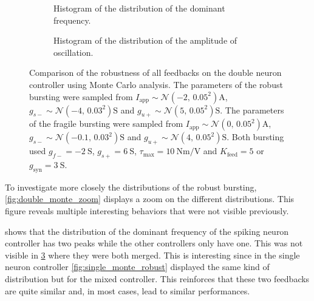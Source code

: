 \begin{figure}[!htbp]
    \centering
    \begin{subfigure}[b]{\textwidth}
        \centering
        \caption{Histogram of the distribution of the dominant frequency.}
        \label{fig:double_monte_freq}
    \end{subfigure}
    
    \begin{subfigure}[b]{\textwidth}
        \centering
        \caption{Histogram of the distribution of the amplitude of oscillation.}
        \label{fig:double_monte_range}
    \end{subfigure}
    \caption{Comparison of the robustness of all feedbacks on the double neuron controller using Monte Carlo analysis. 
    The parameters of the robust bursting were sampled from $I_\text{app} \sim \mathcal{N}\left(-2,\, 0.05^2\right) \unit{\ampere}$, $g_{s-} \sim \mathcal{N}\left(-4,\, 0.03^2\right) \unit{\siemens}$ and $g_{u+} \sim \mathcal{N}\left(5,\, 0.05^2\right) \unit{\siemens}$. 
    The parameters of the fragile bursting were sampled from $I_\text{app} \sim \mathcal{N}\left(0,\, 0.05^2\right) \unit{\ampere}$, $g_{s-} \sim \mathcal{N}\left(-0.1,\, 0.03^2\right) \unit{\siemens}$ and $g_{u+} \sim \mathcal{N}\left(4,\, 0.05^2\right) \unit{\siemens}$. 
    Both bursting used $g_{f-} = \qty{-2}{\siemens}$, $g_{s+} = \qty{6}{\siemens}$, $\tau_\text{max} = \qty{10}{\newton\meter\per\volt}$ and $K_\text{feed} = 5$ or $g_{\text{syn}} = \qty{3}{\siemens}$.}
    \label{fig:double_monte}
\end{figure}

To investigate more closely the distributions of the robust bursting, \cref{fig:double_monte_zoom} displays a zoom on the different distributions.
This figure reveals multiple interesting behaviors that were not visible previously.

 shows that the distribution of the dominant frequency of the spiking neuron controller has two peaks while the other controllers only have one.
This was not visible in \cref{fig:double_monte} where they were both merged.
This is interesting since in the single neuron controller \cref{fig:single_monte_robust} displayed the same kind of distribution but for the mixed controller.
This reinforces that these two feedbacks are quite similar and, in most cases, lead to similar performances.

